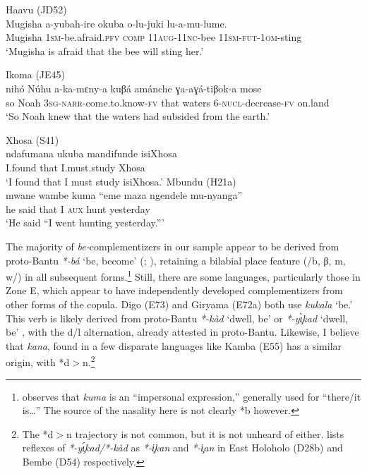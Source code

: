 \documentclass[output=paper,colorlinks,citecolor=brown,
]{langscibook}
\begin{document}
\ea\label{ex:gluckman:be.comp}
	\begin{xlist}
	\ex Haavu (JD52) \\
	\gll Mugisha a-yubah-ire okuba o-lu-juki lu-a-mu-lume.\\
	Mugisha 1\textsc{sm}-be.afraid.\textsc{pfv} \textsc{comp} 11\textsc{aug}-11\textsc{nc}-bee 11\textsc{sm}-\textsc{fut}-1\textsc{om}-sting\\
	\glt `Mugisha is afraid that the bee will sting her.' 

	\ex Ikoma (JE45) \citep[94]{Roth:2018} \\
	\gll nih\'o N\'uhu a-ka-mɛny-a kuβá amánche ɣa-aɣá-tiβok-a mose\\
	so Noah 3\textsc{sg}-\textsc{narr}-come.to.know-\textsc{fv} that waters 6-\textsc{nucl}-decrease-\textsc{fv} on.land\\
	\glt `So Noah knew that the waters had subsided from the earth.'  
	
	\newpage
	\ex Xhosa (S41) \citep[44]{DuPlessis:1989} \\
	\gll ndafumana ukuba mandifunde isiXhosa\\
	I.found that I.must.study Xhosa\\
	\glt `I found that I must study isiXhosa.' 
	\ex Mbundu (H21a) \citep[77-78]{Johnson:1931} \\
	\gll mwane wambe kuma ``eme maza ngendele mu-nyanga''\\
	he said that { }I \textsc{aux} hunt yesterday\\
	\glt `He said ``I went hunting yesterday.''' 
	\end{xlist}
\z

The majority of \textit{be-}complementizers in our sample appear to be derived from proto-Bantu \textit{*-bá} `be, become' (\citealt[17]{Guthrie:1970a}; \citealt[86]{Meeussen:1967}), retaining a bilabial place feature (/b, β, m, w/) in  all subsequent forms.\footnote{\citet[78]{Johnson:1931} observes that \textit{kuma} is an ``impersonal expression,'' generally used for ``there/it is\ldots'' The source of the nasality here is not clearly *b however.} Still, there are some languages, particularly those in Zone E, which appear to have independently developed complementizers from other forms of the copula. Digo (E73) and Giryama (E72a) both use \textit{kukala} `be.' This verb is likely derived from proto-Bantu \textit{*-k\`ad} `dwell, be' \citep[258]{Guthrie:1970a} or \textit{*-y\c{\`\i}kad} `dwell, be' \citep[179]{Guthrie:1970}, with the d/l alternation, already attested in proto-Bantu. Likewise, I believe that \textit{kana}, found in a few disparate languages like  Kamba (E55) has a similar origin, with *d$>$n.\footnote{The *d$>$n trajectory is not common, but it is not unheard of either. \citet{Guthrie:1970a} lists reflexes of \textit{*-y\c{\'\i}kad/*-k\`ad} as \textit{*-\c{i}kan} and \textit{*-\c{i}an} in East Holoholo (D28b) and Bembe (D54) respectively.}
\end{document}
